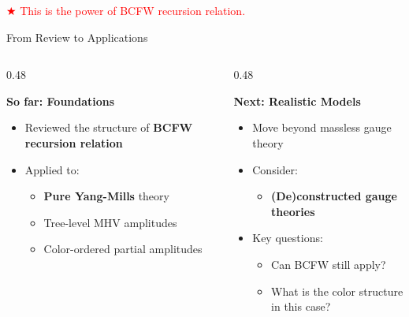 \documentclass{beamer}
\begin{document}
\begin{frame}
\begin{center}
\begin{tikzpicture}[x=0.75pt,y=0.75pt,yscale=-1,xscale=1]
\end{tikzpicture}

\end{center}

\textcolor{red}{$\bigstar$ \Large This is the power of BCFW recursion relation.}

\end{frame}

\begin{frame}{From Review to Applications}

\begin{columns}[T]
  \begin{column}{0.48\textwidth}
    \begin{block}{\centering\large \textbf{So far: Foundations}}
      \begin{itemize}[left=1em]
        \item Reviewed the structure of \textbf{BCFW recursion relation}
        \item Applied to:
          \begin{itemize}[left=0.1em]
            \item \textbf{Pure Yang-Mills} theory
            \item Tree-level MHV amplitudes
            \item Color-ordered partial amplitudes
          \end{itemize}
      \end{itemize}
    \end{block}
  \end{column}
\pause
  \begin{column}{0.48\textwidth}
    \begin{block}{\centering\large \textbf{Next: Realistic Models}}
      \begin{itemize}[left=1em]
        \item Move beyond massless gauge theory
        \item Consider:
          \begin{itemize}[left=0.1em]
            \item \textbf{(De)constructed gauge theories}
          \end{itemize}
        \item Key questions:
          \begin{itemize}[left=0.1em]
            \item Can BCFW still apply?
            \item What is the color structure in this case?
          \end{itemize}
      \end{itemize}
    \end{block}
  \end{column}
\end{columns}

\end{frame}
\end{document}
